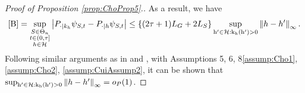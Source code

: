 \begin{proof}[Proof of Proposition \ref{prop:ChoProp5}.]
As a result, we have
$$\cref{B} = \bigsup \abs{\Pdotkh-\Pdot} \leq \{(2\tau + 1) \lipG + 2\lipS \} \suphprimekernel \normh_\infty.$$
Following similar arguments as in 
\cite{meinshausen_quantile_2006} and \cite{cho_multi-stage_2023}, with Assumptions \ifnum{} 5, 6, 8\else \ref{assump:Cho1}, \ref{assump:Cho2}, \ref{assump:CuiAssump2}\fi, it can be shown that $\operatorname*{\sup_{h^{\prime}\in \mathcal{H}: k_h(h^{\prime})>0}} \left\lVert h - h^{\prime}\right\rVert_\infty = o_P(1)$.

\end{proof}
